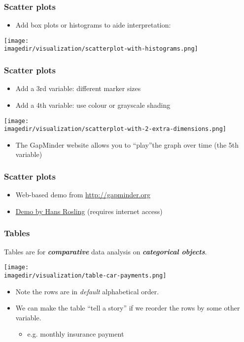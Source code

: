 \begin{frame}\frametitle{Scatter plots}
	\begin{itemize}
		\item	Add box plots or histograms to aide interpretation: 
	\end{itemize}
	\begin{center}
		\texttt{[image: \\imagedir/visualization/scatterplot-with-histograms.png]}
	\end{center}
\end{frame}

\begin{frame}\frametitle{Scatter plots}
	\begin{itemize}
		\item	Add a 3rd variable: different marker sizes 
		\item	Add a 4th variable: use colour or grayscale shading 
	\end{itemize}
	\begin{center}
		\texttt{[image: \\imagedir/visualization/scatterplot-with-2-extra-dimensions.png]}
	\end{center}
	\begin{itemize}
		\item	The GapMinder website allows you to ``play''the graph over time (the 5th variable) 
	\end{itemize}
\end{frame}

\begin{frame}\frametitle{Scatter plots}
	\begin{itemize}
		\item	Web-based demo from \href{http://gapminder.org}{http://gapminder.org} 
		\item	\href{http://www.youtube.com/v/jbkSRLYSojo}{Demo by Hans Rosling} (requires internet access) 
	\end{itemize}
\end{frame}

\begin{frame}\frametitle{Tables}
	
	Tables are for \textbf{\emph{comparative}} data analysis on \textbf{\emph{categorical objects}}.
	\begin{center}
		\texttt{[image: \\imagedir/visualization/table-car-payments.png]}
	\end{center}
	\begin{itemize}
		\item	Note the rows are in \emph{default} alphabetical order. 
		\item	We can make the table ``tell a story'' if we reorder the rows by some other variable. 
		\begin{itemize}
			\item	e.g. monthly insurance payment 
		\end{itemize}
	\end{itemize}
\end{frame}

